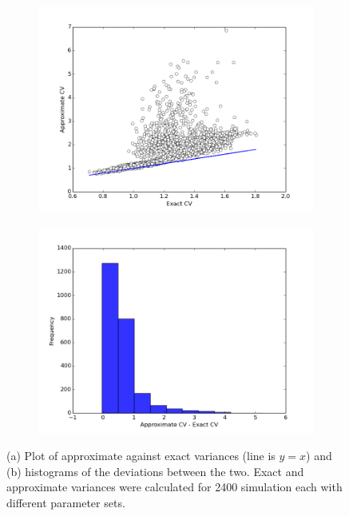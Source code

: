 \documentclass[a4paper,12pt]{article}
\begin{document}
\begin{figure}[!ht]
        \centering
        \begin{subfigure}[!ht]{0.7\textwidth}
                \includegraphics[width=\textwidth]{images/approx_exact_var}
                \caption{}
                \label{fig:approx_exact_var}
        \end{subfigure}%
        
        \begin{subfigure}[b]{0.7\textwidth}
                \includegraphics[width=\textwidth]{images/approx_var_dev}
                \caption{}
                \label{fig:approx_var_dev}
        \end{subfigure}
        
\caption{(a) Plot of approximate against exact variances (line is $y=x$) and (b) histograms of the deviations between the two. Exact and approximate variances were calculated for 2400 simulation each with different parameter sets.}
\label{fig:approx_vars}
\end{figure}
\end{document}
